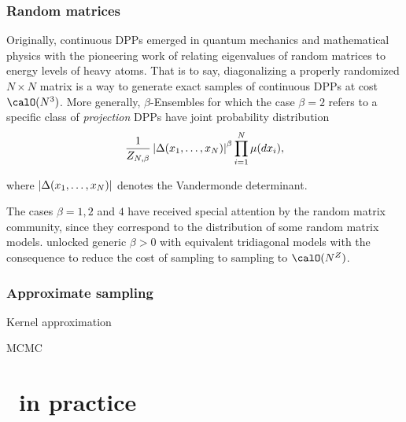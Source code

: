 \documentclass[twoside,11pt]{article}
\begin{document}
    \subsubsection{Random matrices} %
    \label{ssub:random_matrices}

      Originally, continuous DPPs emerged in quantum mechanics and mathematical physics with the pioneering work of \citet{Wig67} relating eigenvalues of random matrices to energy levels of heavy atoms.
      That is to say, diagonalizing a properly randomized $N\times N$ matrix is a way to generate exact samples of continuous DPPs at cost $\calO(N^3)$.
      More generally, $\beta$-Ensembles for which the case $\beta=2$ refers to a specific class of \textit{projection} DPPs \citep{Kon05} have joint probability distribution
      \begin{equation}
        \frac{1}{Z_{N,\beta}}
        \left| \Delta(x_1,\dots,x_N) \right|^{\beta}
        \prod_{i= 1}^N 
          \mu(d x_i),
      \end{equation}

      where $\left| \Delta(x_1,\dots,x_N) \right|$ denotes the Vandermonde determinant.

      The cases $\beta=1, 2$ and $4$ have received special attention by the random matrix community, since they correspond to the distribution of some random matrix models.
      \citet{DuEd02,KiNe04} unlocked generic $\beta>0$ with equivalent tridiagonal models with the consequence to reduce the cost of sampling to sampling to $\calO(N^Z)$.
    

    \subsubsection{Approximate sampling} %
    \label{ssub:approximate_sampling}

      Kernel approximation

      MCMC
    



\section{\DPPy\ in practice} %
\label{sec:dppy_in_practice}
\end{document}
